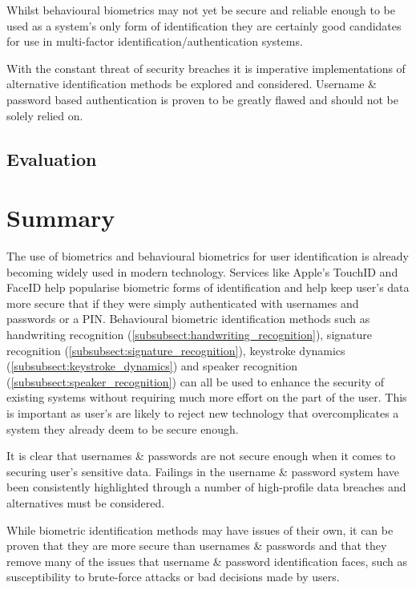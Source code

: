 \documentclass[12pt]{article}
\begin{document}
	Whilst behavioural biometrics may not yet be secure and reliable enough to be used as a system's only form of identification they are certainly good candidates for use in multi-factor identification/authentication systems.
	
	With the constant threat of security breaches it is imperative implementations of alternative identification methods be explored and considered. Username \& password based authentication is proven to be greatly flawed and should not be solely relied on.
	
	\subsection{Evaluation}
	\section{Summary}
	The use of biometrics and behavioural biometrics for user identification is already becoming widely used in modern technology. Services like Apple's TouchID and FaceID help popularise biometric forms of identification and help keep user's data more secure that if they were simply authenticated with usernames and passwords or a PIN. Behavioural biometric identification methods such as handwriting recognition (\ref{subsubsect:handwriting_recognition}), signature recognition (\ref{subsubsect:signature_recognition}), keystroke dynamics (\ref{subsubsect:keystroke_dynamics}) and speaker recognition (\ref{subsubsect:speaker_recognition}) can all be used to enhance the security of existing systems without requiring much more effort on the part of the user. This is important as user's are likely to reject new technology that overcomplicates a system they already deem to be secure enough.
	
	It is clear that usernames \& passwords are not secure enough when it comes to securing user's sensitive data. Failings in the username \& password system have been consistently highlighted through a number of high-profile data breaches and alternatives must be considered.
	
	While biometric identification methods may have issues of their own, it can be proven that they are more secure than usernames \& passwords and that they remove many of the issues that username \& password identification faces, such as susceptibility to brute-force attacks or bad decisions made by users.
	
	 
	
\end{document}

